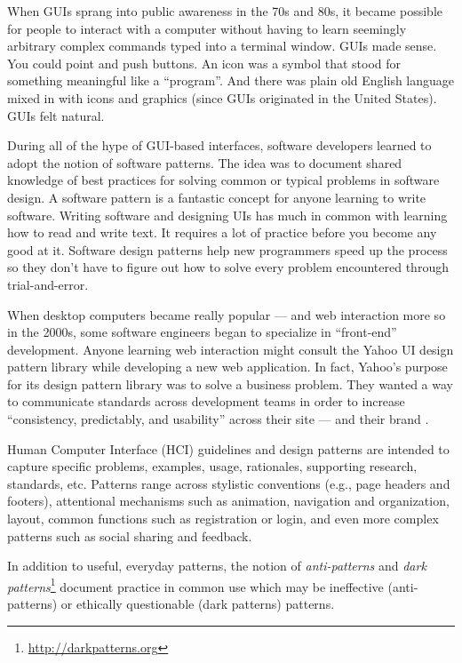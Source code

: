 When GUIs sprang into public awareness in the 70s and 80s, it became possible for people to interact with a computer without having to learn seemingly arbitrary complex commands typed into a terminal window. GUIs made sense. You could point and push buttons. An icon was a symbol that stood for something meaningful like a ``program''. And there was plain old English language mixed in with icons and graphics (since GUIs originated in the United States). GUIs felt natural.

During all of the hype of GUI-based interfaces, software developers learned to adopt the notion of software patterns. The idea was to document shared knowledge of best practices for solving common or typical problems in software design. A software pattern is a fantastic concept for anyone learning to write software. Writing software and designing UIs has much in common with learning how to read and write text. It requires a lot of practice before you become any good at it. Software design patterns help new programmers speed up the process so they don't have to figure out how to solve every problem encountered through trial-and-error.

When desktop computers became really popular --- and web interaction more so in the 2000s, some software engineers began to specialize in ``front-end'' development. Anyone learning web interaction might consult the Yahoo UI design pattern library while developing a new web application. In fact, Yahoo's purpose for its design pattern library was to solve a business problem. They wanted a way to communicate standards across development teams in order to increase ``consistency, predictably, and usability'' across their site --- and their brand  \citep{Leacock:2005ut}. 

Human Computer Interface (HCI) guidelines and design patterns are intended to capture specific problems, examples, usage, rationales, supporting research, standards, etc. Patterns range across stylistic conventions (e.g., page headers and footers), attentional mechanisms such as animation, navigation and organization, layout, common functions such as registration or login, and even more complex patterns such as social sharing and feedback. 

In addition to useful, everyday patterns, the notion of \emph{anti-patterns} and  \textit{dark patterns}\footnote{\url{http://darkpatterns.org}}  document practice in common use which may be ineffective (anti-patterns) or ethically questionable (dark patterns) patterns.

